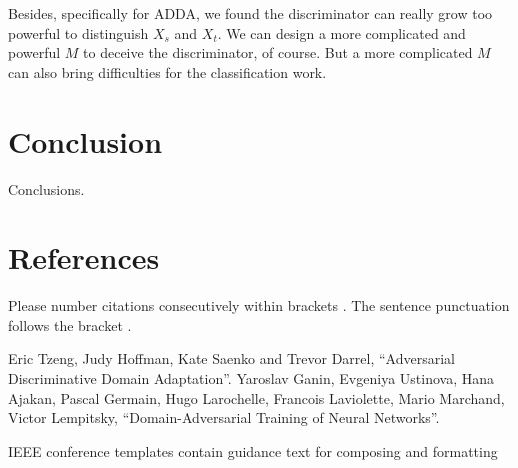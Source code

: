 \documentclass[conference]{IEEEtran}
\begin{document}
Besides, specifically for ADDA, we found the discriminator can really grow too powerful to distinguish $X_s$ and $X_t$. We can design a more complicated and powerful $M$ to deceive the discriminator, of course. But a more complicated $M$ can also bring difficulties for the classification work.


\section{Conclusion}
Conclusions.


\section*{References}

Please number citations consecutively within brackets \cite{b1}. The
sentence punctuation follows the bracket \cite{b2}.

\begin{thebibliography}{00}
 Eric Tzeng, Judy Hoffman, Kate Saenko and Trevor Darrel, ``Adversarial Discriminative Domain Adaptation''.
 Yaroslav Ganin, Evgeniya Ustinova, Hana Ajakan, Pascal Germain, Hugo Larochelle, Francois Laviolette, 
    Mario Marchand, Victor Lempitsky, ``Domain-Adversarial Training of Neural Networks''.
\end{thebibliography}
\vspace{12pt}
\color{red}
IEEE conference templates contain guidance text for composing and formatting
\end{document}
